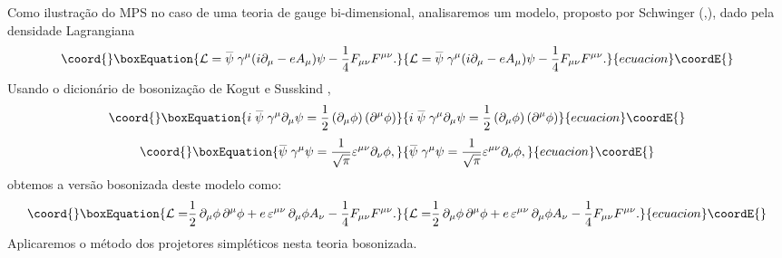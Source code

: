 \documentclass[a4paper,thmsa,12pt]{report}
\begin{document}
Como ilustra\c{c}\~{a}o do MPS no caso de uma teoria de gauge
bi-dimensional, analisaremos um modelo, proposto por Schwinger (\cite
{schwinger},\cite{swieca}), dado pela densidade Lagrangiana 
\begin{equation}\coord{}\boxEquation{
\mathcal{L=}\stackrel{\_}{\psi }\gamma ^{\mu }(i\partial _{\mu }-eA_{\mu
})\psi -\frac{1}{4}F_{\mu \nu }F^{\mu \nu }.  \label{309}
}{
\mathcal{L=}\stackrel{\_}{\psi }\gamma ^{\mu }(i\partial _{\mu }-eA_{\mu
})\psi -\frac{1}{4}F_{\mu \nu }F^{\mu \nu }.  }{ecuacion}\coordE{}\end{equation}
Usando o dicion\'{a}rio de bosoniza\c{c}\~{a}o de Kogut e Susskind \cite
{kogut}, 
\begin{equation}\coord{}\boxEquation{
i\stackrel{\_}{\psi }\gamma ^{\mu }\partial _{\mu }\psi =\frac{1}{2}\left(
\partial _{\mu }\phi \right) \left( \partial ^{\mu }\phi \right)  \label{310}
}{
i\stackrel{\_}{\psi }\gamma ^{\mu }\partial _{\mu }\psi =\frac{1}{2}\left(
\partial _{\mu }\phi \right) \left( \partial ^{\mu }\phi \right)  }{ecuacion}\coordE{}\end{equation}
\begin{equation}\coord{}\boxEquation{
\stackrel{\_}{\psi }\gamma ^{\mu }\psi =\frac{1}{\sqrt{\pi }}\varepsilon
^{\mu \nu }\partial _{\nu }\phi ,  \label{311}
}{
\stackrel{\_}{\psi }\gamma ^{\mu }\psi =\frac{1}{\sqrt{\pi }}\varepsilon
^{\mu \nu }\partial _{\nu }\phi ,  }{ecuacion}\coordE{}\end{equation}
obtemos a vers\~{a}o bosonizada deste modelo como: 
\begin{equation}\coord{}\boxEquation{
\mathcal{L=}\frac{1}{2}\,\partial _{\mu }\phi \,\partial ^{\mu }\phi
+e\,\varepsilon ^{\mu \nu }\,\partial _{\mu }\phi A_{\nu }-\frac{1}{4}F_{\mu \nu
}F^{\mu \nu }.  \label{312}
}{
\mathcal{L=}\frac{1}{2}\,\partial _{\mu }\phi \,\partial ^{\mu }\phi
+e\,\varepsilon ^{\mu \nu }\,\partial _{\mu }\phi A_{\nu }-\frac{1}{4}F_{\mu \nu
}F^{\mu \nu }.  }{ecuacion}\coordE{}\end{equation}
Aplicaremos o m\'{e}todo dos projetores simpl\'{e}ticos nesta teoria
bosonizada.
\end{document}
